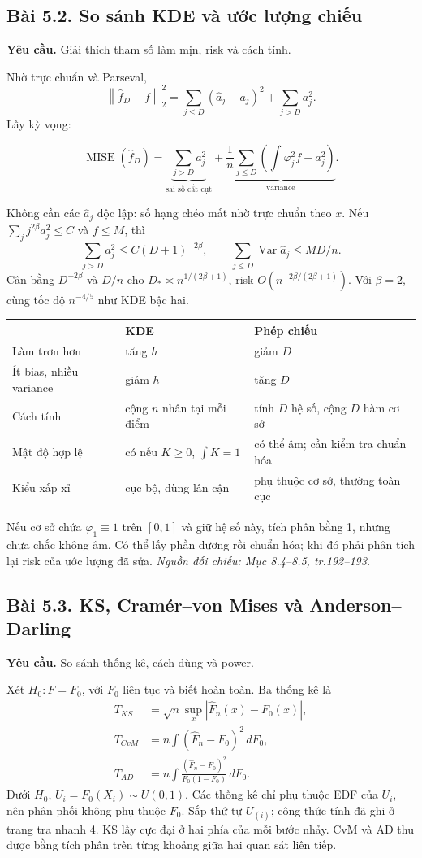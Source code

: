 \documentclass[11pt,a4paper]{article}
\DeclareMathOperator{\Var}{Var}\DeclareMathOperator{\Cov}{Cov}
\DeclareMathOperator{\MISE}{MISE}\DeclareMathOperator{\AMISE}{AMISE}
\newcommand{\Fh}{\widehat F_n}\newcommand{\fh}{\widehat f_h}
\newcommand{\norm}[1]{\left\lVert#1\right\rVert}
\newcommand{\src}[1]{\textit{Nguồn đối chiếu: #1.}}
\newcommand{\prob}[3]{\subsection{Bài #1. #2}\label{b:#1}\textbf{Yêu cầu.} #3\par}
\begin{document}
\prob{5.2}{So sánh KDE và ước lượng chiếu}{Giải thích tham số làm mịn, risk và cách tính.}
Nhờ trực chuẩn và Parseval,
\[
\norm{\widehat f_D-f}_2^2=\sum_{j\le D}(\widehat a_j-a_j)^2+\sum_{j>D}a_j^2.
\]
Lấy kỳ vọng:
\begin{result}
\[
\MISE(\widehat f_D)=\underbrace{\sum_{j>D}a_j^2}_{\text{sai số cắt cụt}}+
\underbrace{\frac1n\sum_{j\le D}\left(\int\varphi_j^2f-a_j^2\right)}_{\text{variance}}.
\]
\end{result}
Không cần các $\widehat a_j$ độc lập: số hạng chéo mất nhờ trực chuẩn theo $x$.
Nếu $\sum_jj^{2\beta}a_j^2\le C$ và $f\le M$, thì
\[
\sum_{j>D}a_j^2\le C(D+1)^{-2\beta},\qquad
\sum_{j\le D}\Var\widehat a_j\le MD/n.
\]
Cân bằng $D^{-2\beta}$ và $D/n$ cho $D_*\asymp n^{1/(2\beta+1)}$, risk $O(n^{-2\beta/(2\beta+1)})$. Với $\beta=2$, cùng tốc độ $n^{-4/5}$ như KDE bậc hai.
\begin{center}\begin{tabular}{>{\raggedright\arraybackslash}p{3cm}>{\raggedright\arraybackslash}p{5.4cm}>{\raggedright\arraybackslash}p{5.4cm}}
\toprule & KDE & Phép chiếu\\\midrule
Làm trơn hơn & tăng $h$ & giảm $D$\\
Ít bias, nhiều variance & giảm $h$ & tăng $D$\\
Cách tính & cộng $n$ nhân tại mỗi điểm & tính $D$ hệ số, cộng $D$ hàm cơ sở\\
Mật độ hợp lệ & có nếu $K\ge0$, $\int K=1$ & có thể âm; cần kiểm tra chuẩn hóa\\
Kiểu xấp xỉ & cục bộ, dùng lân cận & phụ thuộc cơ sở, thường toàn cục\\\bottomrule
\end{tabular}\end{center}
Nếu cơ sở chứa $\varphi_1\equiv1$ trên $[0,1]$ và giữ hệ số này, tích phân bằng 1, nhưng chưa chắc không âm. Có thể lấy phần dương rồi chuẩn hóa; khi đó phải phân tích lại risk của ước lượng đã sửa.
\src{Mục 8.4--8.5, tr.192--193}

\prob{5.3}{KS, Cramér--von Mises và Anderson--Darling}{So sánh thống kê, cách dùng và power.}
Xét $H_0:F=F_0$, với $F_0$ liên tục và biết hoàn toàn. Ba thống kê là
\begin{align*}
T_{KS}&=\sqrt n\sup_x|\Fh(x)-F_0(x)|,\\
T_{CvM}&=n\int(\Fh-F_0)^2\,dF_0,\\
T_{AD}&=n\int\frac{(\Fh-F_0)^2}{F_0(1-F_0)}\,dF_0.
\end{align*}
Dưới $H_0$, $U_i=F_0(X_i)\sim U(0,1)$. Các thống kê chỉ phụ thuộc EDF của $U_i$, nên phân phối không phụ thuộc $F_0$. Sắp thứ tự $U_{(i)}$; công thức tính đã ghi ở trang tra nhanh 4. KS lấy cực đại ở hai phía của mỗi bước nhảy. CvM và AD thu được bằng tích phân trên từng khoảng giữa hai quan sát liên tiếp.
\end{document}
